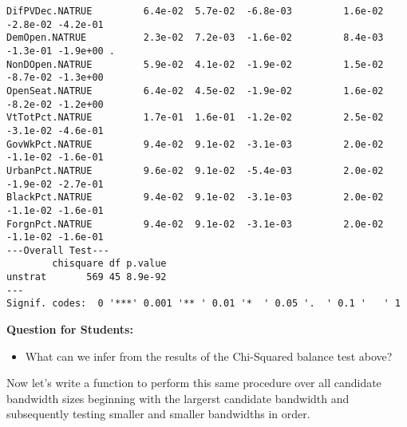 \documentclass[11pt,leqno]{article}\usepackage[]{graphicx}\usepackage[]{color}
\makeatletter
\newenvironment{kframe}{%
 \def\at@end@of@kframe{}%
 \ifinner\ifhmode%
  \def\at@end@of@kframe{\end{minipage}}%
  \begin{minipage}{\columnwidth}%
 \fi\fi%
 \def\FrameCommand##1{\hskip\@totalleftmargin \hskip-\fboxsep
 \colorbox{shadecolor}{##1}\hskip-\fboxsep
     \hskip-\linewidth \hskip-\@totalleftmargin \hskip\columnwidth}%
 \MakeFramed {\advance\hsize-\width
   \@totalleftmargin\z@ \linewidth\hsize
   \@setminipage}}%
 {\par\unskip\endMakeFramed%
 \at@end@of@kframe}
\newenvironment{knitrout}{}{} %
\theoremstyle{newstyle}
\makeatother
\begin{document}
\begin{knitrout}
\begin{kframe}
\begin{verbatim}
DifPVDec.NATRUE         6.4e-02  5.7e-02  -6.8e-03         1.6e-02  -2.8e-02 -4.2e-01         
DemOpen.NATRUE          2.3e-02  7.2e-03  -1.6e-02         8.4e-03  -1.3e-01 -1.9e+00 .       
NonDOpen.NATRUE         5.9e-02  4.1e-02  -1.9e-02         1.5e-02  -8.7e-02 -1.3e+00         
OpenSeat.NATRUE         6.4e-02  4.5e-02  -1.9e-02         1.6e-02  -8.2e-02 -1.2e+00         
VtTotPct.NATRUE         1.7e-01  1.6e-01  -1.2e-02         2.5e-02  -3.1e-02 -4.6e-01         
GovWkPct.NATRUE         9.4e-02  9.1e-02  -3.1e-03         2.0e-02  -1.1e-02 -1.6e-01         
UrbanPct.NATRUE         9.6e-02  9.1e-02  -5.4e-03         2.0e-02  -1.9e-02 -2.7e-01         
BlackPct.NATRUE         9.4e-02  9.1e-02  -3.1e-03         2.0e-02  -1.1e-02 -1.6e-01         
ForgnPct.NATRUE         9.4e-02  9.1e-02  -3.1e-03         2.0e-02  -1.1e-02 -1.6e-01         
---Overall Test---
        chisquare df p.value
unstrat       569 45 8.9e-92
---
Signif. codes:  0 '***' 0.001 '** ' 0.01 '*  ' 0.05 '.  ' 0.1 '   ' 1 
\end{verbatim}
\end{kframe}
\end{knitrout}


\textbf{Question for Students:}
\vspace{-5mm}
\begin{itemize}\itemsep1pt
\item What can we infer from the results of the Chi-Squared balance test above?
\end{itemize}


Now let's write a function to perform this same procedure over all candidate bandwidth sizes beginning with the largerst candidate bandwidth and subsequently testing smaller and smaller bandwidths in order.
\end{document}
